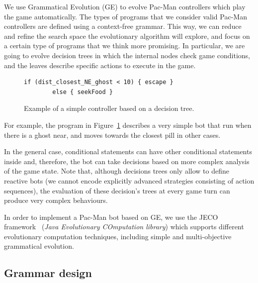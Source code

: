 \documentclass{llncs}
\newcommand{\paco}{Pac-Man }
\begin{document}
We use Grammatical Evolution (GE) to evolve \paco controllers which play the game automatically. The types of programs that we consider valid \paco controllers are defined using a context-free grammar. This way, we can reduce and refine the search space the evolutionary algorithm will explore, and focus on a certain type of programs that we think more promising. In particular, we are going to evolve decision trees in which the internal nodes check game conditions, and the leaves describe specific actions to execute in the game.

\begin{figure}[tb]
	\centering
\begin{lstlisting}[frame=single, breaklines=no, basicstyle=\fontsize{10}{11}\ttfamily]
        if (dist_closest_NE_ghost < 10) { escape } 
        else { seekFood }
\end{lstlisting} %
	\caption{Example of a simple controller based on a decision tree.}
	\label{fig:example}
\end{figure}

For example, the program in Figure~\ref{fig:example} describes a very simple bot that run when there is a ghost near, and moves towards the closest pill in other cases. 

In the general case, conditional statements can have other conditional statements inside and, therefore, the bot can take decisions based on more complex analysis of the game state. Note that, although decisions trees only allow to define reactive bots (we cannot encode explicitly advanced strategies consisting of action sequences), the evaluation of these decision's trees at every game turn can produce very complex behaviours. 

In order to implement a \paco bot based on GE, we use the JECO framework~\cite{jecorepo} (\textit{Java Evolutionary COmputation library}) which supports different evolutionary computation techniques, including simple and multi-objective grammatical evolution.

\subsection{Grammar design}
\end{document}
